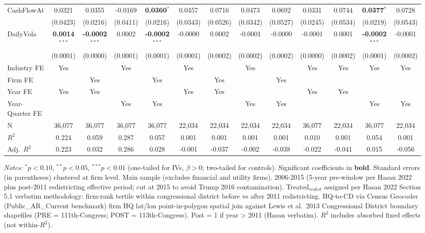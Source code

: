 \begin{landscape}
\begin{table}[H]
\begin{tabular}{lcccccccccccc}
CashFlowAt & 0.0321 & 0.0355 & -0.0169 & \textbf{0.0360}$^{*}$ & 0.0457 & 0.0716 & 0.0473 & 0.0692 & 0.0331 & 0.0744 & \textbf{0.0377}$^{*}$ & 0.0728 \\
 & (0.0423) & (0.0216) & (0.0411) & (0.0216) & (0.0343) & (0.0526) & (0.0342) & (0.0527) & (0.0245) & (0.0534) & (0.0219) & (0.0543) \\
DailyVola & \textbf{0.0014}$^{***}$ & \textbf{-0.0002}$^{***}$ & 0.0002 & \textbf{-0.0002}$^{***}$ & -0.0000 & 0.0002 & -0.0001 & -0.0000 & -0.0001 & 0.0001 & \textbf{-0.0002}$^{***}$ & -0.0001 \\
 & (0.0001) & (0.0000) & (0.0001) & (0.0001) & (0.0001) & (0.0002) & (0.0002) & (0.0002) & (0.0000) & (0.0002) & (0.0001) & (0.0002) \\
\midrule
Industry FE & Yes &  & Yes &  & Yes &  & Yes &  & Yes & Yes & Yes & Yes \\
Firm FE &  & Yes &  & Yes &  & Yes &  & Yes &  &  &  &  \\
Year FE & Yes & Yes &  &  & Yes & Yes &  &  & Yes & Yes &  &  \\
Year-Quarter FE &  &  & Yes & Yes &  &  & Yes & Yes &  &  & Yes & Yes \\
\midrule
N & 36,077 & 36,077 & 36,077 & 36,077 & 22,034 & 22,034 & 22,034 & 22,034 & 36,077 & 22,034 & 36,077 & 22,034 \\
$R^2$ & 0.224 & 0.059 & 0.287 & 0.057 & 0.001 & 0.001 & 0.001 & 0.001 & 0.010 & 0.001 & 0.054 & 0.001 \\
Adj.~$R^2$ & 0.223 & 0.032 & 0.286 & 0.028 & -0.001 & -0.037 & -0.002 & -0.038 & -0.022 & -0.041 & 0.015 & -0.056 \\
\bottomrule
\end{tabular}
\begin{minipage}{\linewidth}
\vspace{2pt}\scriptsize
\textit{Notes:} $^{*}p<0.10$, $^{**}p<0.05$, $^{***}p<0.01$ (one-tailed for IVs, $\beta > 0$; two-tailed for controls).
 Significant coefficients in \textbf{bold}.
 Standard errors (in parentheses) clustered at firm level.
 Main sample (excludes financial and utility firms). 2006-2015 (5-year pre-window per Hasan 2022 plus post-2011 redistricting effective period; cut at 2015 to avoid Trump 2016 contamination). Treated$_{redist}$ assigned per Hasan 2022 Section 5.1 verbatim methodology: firm-rank tertile within congressional district before vs after 2011 redistricting. HQ-to-CD via Census Geocoder (Public\_AR\_Current benchmark) firm HQ lat/lon point-in-polygon spatial join against Lewis et al.\ 2013 Congressional District boundary shapefiles (PRE = 111th-Congress; POST = 113th-Congress). Post = 1 if year > 2011 (Hasan verbatim).
 $R^2$ includes absorbed fixed effects (not within-$R^2$).
\end{minipage}
\end{table}
\end{landscape}